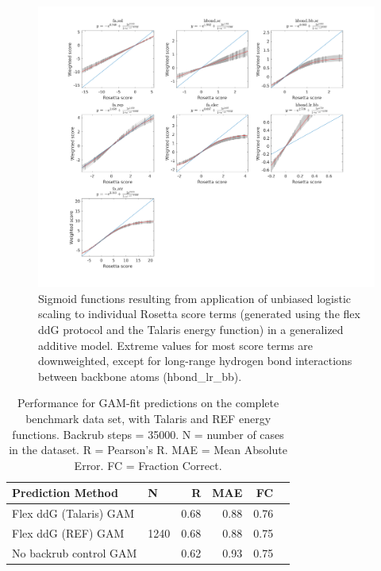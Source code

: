 \documentclass[journal=jpcbfk,manuscript=suppinfo]{achemso}
\begin{document}
\begin{figure}
  \centering
  \includegraphics[width=\textwidth,keepaspectratio]{figures/zemu-sigmoid2-tal-feats.png}
  \caption[Sigmoid fit Rosetta score function terms]{
    Sigmoid functions resulting from application of unbiased logistic scaling to individual Rosetta score terms (generated using the flex ddG protocol and the Talaris energy function\cite{song_structure-guided_2011,shapovalov_smoothed_2011,omeara_combined_2015}) in a generalized additive model. Extreme values for most score terms are downweighted, except for long-range hydrogen bond interactions between backbone atoms (hbond\_lr\_bb).
  } \label{fig:t14-fits-feats}
\end{figure}

\begin{table}
  \begin{tabular}{llrrrr}
\toprule
Prediction Method &     N &    R &  MAE &   FC \\
\midrule
 Flex ddG (Talaris) GAM & \multirow{ 4}{*}{1240} & 0.68 & 0.88 & 0.76 \\
 Flex ddG (REF) GAM & & 0.68 & 0.88 & 0.75  \\
 No backrub control GAM & & 0.62 & 0.93 & 0.75  \\
\bottomrule
\end{tabular}
  \caption[]{
    Performance for GAM-fit predictions on the complete benchmark data set, with Talaris\cite{song_structure-guided_2011,shapovalov_smoothed_2011,omeara_combined_2015} and REF\cite{alford_rosetta_2017} energy functions. Backrub steps = 35000. N = number of cases in the dataset. R = Pearson's R. MAE = Mean Absolute Error. FC = Fraction Correct.
  } \label{tab:table-gam-fit}
\end{table}
\end{document}
